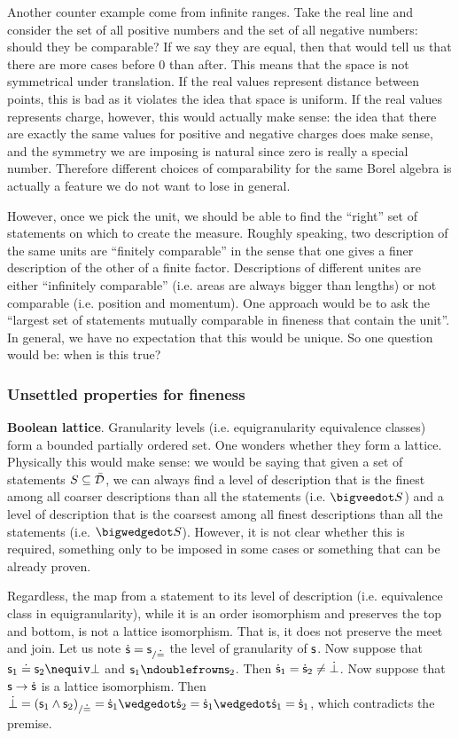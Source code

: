 \documentclass[11pt]{article}
\begin{document}
Another counter example come from infinite ranges. Take the real line and consider the set of all positive numbers and the set of all negative numbers: should they be comparable? If we say they are equal, then that would tell us that there are more cases before 0 than after. This means that the space is not symmetrical under translation. If the real values represent distance between points, this is bad as it violates the idea that space is uniform. If the real values represents charge, however, this would actually make sense: the idea that there are exactly the same values for positive and negative charges does make sense, and the symmetry we are imposing is natural since zero is really a special number. Therefore different choices of comparability for the same Borel algebra is actually a feature we do not want to lose in general.

However, once we pick the unit, we should be able to find the ``right'' set of statements on which to create the measure. Roughly speaking, two description of the same units are ``finitely comparable'' in the sense that one gives a finer description of the other of a finite factor. Descriptions of different unites are either ``infinitely comparable'' (i.e. areas are always bigger than lengths) or not comparable (i.e. position and momentum). One approach would be to ask the ``largest set of statements mutually comparable in fineness that contain the unit''. In general, we have no expectation that this would be unique. So one question would be: when is this true?

\subsubsection{Unsettled properties for fineness}

\textbf{Boolean lattice}. Granularity levels (i.e. equigranularity equivalence classes) form a bounded partially ordered set. One wonders whether they form a lattice. Physically this would make sense: we would be saying that given a set of statements $S \subseteq \bar{\mathcal{D}}$, we can always find a level of description that is the finest among all coarser descriptions than all the statements (i.e. $\bigveedot S$) and a level of description that is the coarsest among all finest descriptions than all the statements (i.e. $\bigwedgedot S$). However, it is not clear whether this is required, something only to be imposed in some cases or something that can be already proven.

Regardless, the map from a statement to its level of description (i.e. equivalence class in equigranularity), while it is an order isomorphism and preserves the top and bottom, is not a lattice isomorphism. That is, it does not preserve the meet and join. Let us note $\dot{\mathsf{s}} = {\mathsf{s}}_{/\doteq}$ the level of granularity of $\mathsf{s}$. Now suppose that $\stmt_1 \eqgran \stmt_2 \nequiv \impossibility$ and $\stmt_1 \ncomp \stmt_2$. Then $\dot{\mathsf{s}}_1 = \dot{\mathsf{s}}_2 \neq \dot{\bot}$. Now suppose that $\mathsf{s} \to \dot{\mathsf{s}}$ is a lattice isomorphism. Then $\dot{\impossibility} = (\stmt_1 \AND \stmt_2)_{/\eqgran} = \dot{\stmt}_1 \wedgedot \dot{\stmt}_2 = \dot{\stmt}_1 \wedgedot \dot{\stmt}_1 = \dot{\stmt}_1$, which contradicts the premise.
\end{document}
